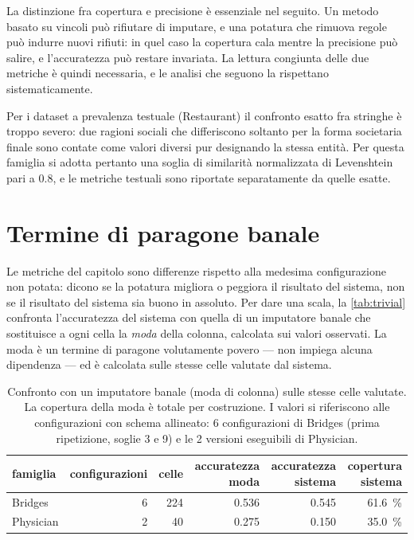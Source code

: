 La distinzione fra copertura e precisione è essenziale nel seguito. Un metodo basato su vincoli
può rifiutare di imputare, e una potatura che rimuova regole può indurre nuovi rifiuti: in quel
caso la copertura cala mentre la precisione può salire, e l'accuratezza può restare invariata. La
lettura congiunta delle due metriche è quindi necessaria, e le analisi che seguono la rispettano
sistematicamente.

Per i dataset a prevalenza testuale (Restaurant) il confronto esatto fra stringhe è troppo
severo: due ragioni sociali che differiscono soltanto per la forma societaria finale sono contate
come valori diversi pur designando la stessa entità. Per questa famiglia si adotta pertanto una
soglia di similarità normalizzata di Levenshtein pari a \num{0.8}, e le metriche testuali sono
riportate separatamente da quelle esatte.

\section{Termine di paragone banale}\label{sec:trivial-baseline}

Le metriche del capitolo sono differenze rispetto alla medesima configurazione non potata: dicono
se la potatura migliora o peggiora il risultato del sistema, non se il risultato del sistema sia
buono in assoluto. Per dare una scala, la \autoref{tab:trivial} confronta l'accuratezza del
sistema con quella di un imputatore banale che sostituisce a ogni cella la \emph{moda} della
colonna, calcolata sui valori osservati. La moda è un termine di paragone volutamente povero ---
non impiega alcuna dipendenza --- ed è calcolata sulle stesse celle valutate dal sistema.

\begin{table}[htbp]
\centering
\caption{Confronto con un imputatore banale (moda di colonna) sulle stesse celle valutate. La
copertura della moda è totale per costruzione. I valori si riferiscono alle configurazioni con
schema allineato: \num{6} configurazioni di Bridges (prima ripetizione, soglie 3 e 9) e le
\num{2} versioni eseguibili di Physician.}
\label{tab:trivial}
\footnotesize
\begin{tabular}{@{}lrrrrr@{}}
\toprule
famiglia & configurazioni & celle & accuratezza moda & accuratezza sistema & copertura sistema \\
\midrule
Bridges   & \num{6} & \num{224} & \num{0.536} & \num{0.545} & \SI{61.6}{\percent} \\
Physician & \num{2} & \num{40}  & \num{0.275} & \num{0.150} & \SI{35.0}{\percent} \\
\bottomrule
\end{tabular}
\end{table}

